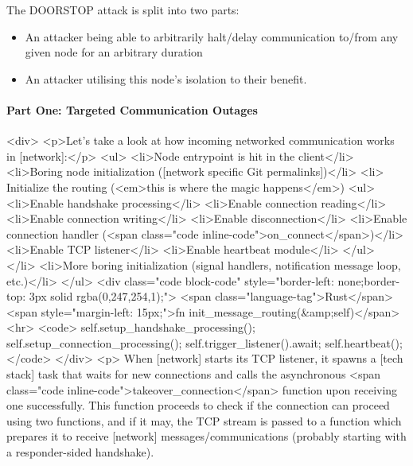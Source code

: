 The DOORSTOP attack is split into two parts:

\begin{itemize}
\item An attacker being able to arbitrarily halt/delay communication to/from any given node for an arbitrary duration
\item An attacker utilising this node's isolation to their benefit.
\end{itemize}

\paragraph{Part One: Targeted Communication Outages}

\begin{rawhtml}
<div>
        	<p>Let's take a look at how incoming networked communication works in [network]:</p>
        	<ul>
        		<li>Node entrypoint is hit in the client</li>
        		<li>Boring node initialization ([network specific Git permalinks])</li>
        		<li>
        			Initialize the routing (<em>this is where the magic happens</em>)
        			<ul>
        				<li>Enable handshake processing</li>
        				<li>Enable connection reading</li>
        				<li>Enable connection writing</li>
        				<li>Enable disconnection</li>
        				<li>Enable connection handler (<span class="code inline-code">on_connect</span>)</li>
        				<li>Enable TCP listener</li>
        				<li>Enable heartbeat module</li>
        			</ul>
        		</li>
        		<li>More boring initialization (signal handlers, notification message loop, etc.)</li>
        	</ul>
           	<div class="code block-code" style="border-left: none;border-top: 3px solid rgba(0,247,254,1);">
               <span class="language-tag">Rust</span><span style="margin-left: 15px;">fn init_message_routing(&amp;self)</span>
               <hr>
               <code>
               self.setup_handshake_processing();
               self.setup_connection_processing();
               self.trigger_listener().await;
               self.heartbeat();
               </code>
            </div>
            <p>
            	When [network] starts its TCP listener, it spawns a [tech stack] task that waits for new connections and calls the asynchronous <span class="code inline-code">takeover_connection</span> function upon receiving one successfully. This function proceeds to check if the connection can proceed using two functions, and if it may, the TCP stream is passed to a function which prepares it to receive [network] messages/communications (probably starting with a responder-sided handshake).

\end{rawhtml}
